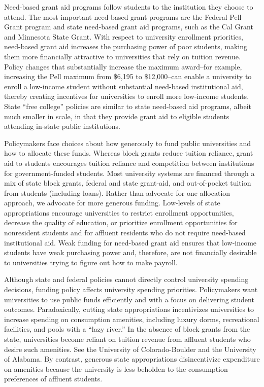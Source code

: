 \documentclass{article}
\begin{document}
Need-based grant aid programs follow students to the institution they choose to attend. The most important need-based grant programs are the Federal Pell Grant program and state need-based grant aid programs, such as the Cal Grant and Minnesota State Grant. With respect to university enrollment priorities, need-based grant aid increases the purchasing power of poor students, making them more financially attractive to universities that rely on tuition revenue. Policy changes that substantially increase the maximum award--for example, increasing the Pell maximum from \$6,195 to \$12,000--can enable a university to enroll a low-income student without substantial need-based institutional aid, thereby creating incentives for universities to enroll more low-income students. State ``free college'' policies are similar to state need-based aid programs, albeit much smaller in scale, in that they provide grant aid to eligible students attending in-state public institutions.

Policymakers face choices about how generously to fund public universities and how to allocate these funds. Whereas block grants reduce tuition reliance, grant aid to students encourages tuition reliance and competition between institutions for government-funded students.  Most university systems are financed through a mix of state block grants, federal and state grant-aid, and out-of-pocket tuition from students (including loans). Rather than advocate for one allocation approach, we advocate for more generous funding.  Low-levels of state appropriations encourage universities to restrict enrollment opportunities, decrease the quality of education, or prioritize enrollment opportunities for nonresident students and for affluent residents who do not require need-based institutional aid. Weak funding for need-based grant aid ensures that low-income students have weak purchasing power and, therefore, are not financially desirable to universities trying to figure out how to make payroll.


Although state and federal policies cannot directly control university spending decisions, funding policy affects university spending priorities. Policymakers want universities to use public funds efficiently and with a focus on delivering student outcomes. Paradoxically, cutting state appropriations incentivizes universities to increase spending on consumption amenities, including luxury dorms, recreational facilities, and pools with a ``lazy river.'' In the absence of block grants from the state, universities become reliant on tuition revenue from affluent students who desire such amenities.  See the University of Colorado-Boulder and the University of Alabama.  By contrast, generous state appropriations disincentivize expenditure on amenities because the university is less beholden to the consumption preferences of affluent students. 
\end{document}
